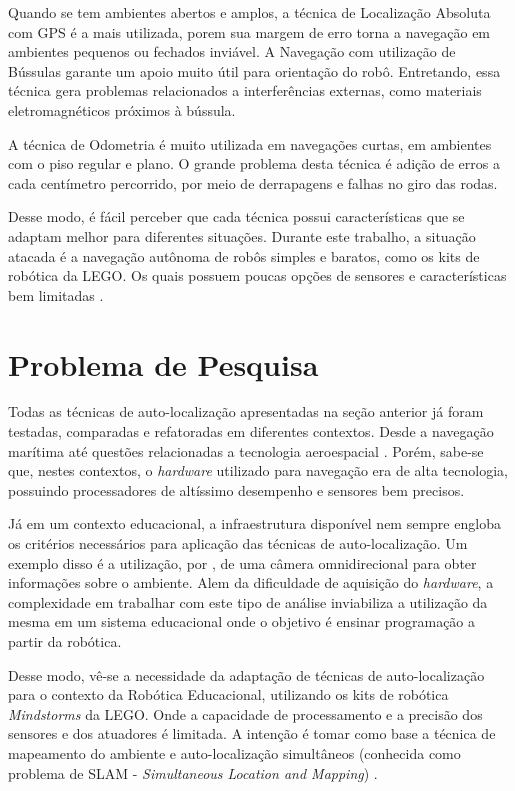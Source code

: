 	Quando se tem ambientes abertos e amplos, a técnica de Localização Absoluta com GPS é a mais utilizada, porem sua margem de erro torna a navegação em ambientes pequenos ou fechados inviável. A Navegação com utilização de Bússulas garante um apoio muito útil para orientação do robô. Entretando, essa técnica gera problemas relacionados a interferências externas, como materiais eletromagnéticos próximos à bússula.
	
	A técnica de Odometria é muito utilizada em navegações curtas, em ambientes com o piso regular e plano. O grande problema desta técnica é adição de erros a cada centímetro percorrido, por meio de derrapagens e falhas no giro das rodas. 

	Desse modo, é fácil perceber que cada técnica possui características que se adaptam melhor para diferentes situações. Durante este trabalho, a situação atacada é a navegação autônoma de robôs simples e baratos, como os kits de robótica da LEGO. Os quais possuem poucas opções de sensores e características bem limitadas \cite{drawLegoRobot}.

\section{Problema de Pesquisa}

	Todas as técnicas de auto-localização apresentadas na seção anterior já foram testadas, comparadas e refatoradas em diferentes contextos. Desde a navegação marítima até questões relacionadas a tecnologia aeroespacial \cite{localizacaoEMapeamentoPaulo}. Porém, sabe-se que, nestes contextos, o \textit{hardware} utilizado para navegação era de alta tecnologia, possuindo processadores de altíssimo desempenho e sensores bem precisos.

	Já em um contexto educacional, a infraestrutura disponível nem sempre engloba os critérios necessários para aplicação das técnicas de auto-localização. Um exemplo disso é a utilização, por \cite{localizacaoEMapeamentoPaulo}, de uma câmera omnidirecional para obter informações sobre o ambiente. Alem da dificuldade de aquisição do \textit{hardware}, a complexidade em trabalhar com este tipo de análise inviabiliza a utilização da mesma em um sistema educacional onde o objetivo é ensinar programação a partir da robótica.

	Desse modo, vê-se a necessidade da adaptação de técnicas de auto-localização para o contexto da Robótica Educacional, utilizando os kits de robótica \textit{Mindstorms} da LEGO. Onde a capacidade de processamento e a precisão dos sensores e dos atuadores é limitada. A intenção é tomar como base a técnica de mapeamento do ambiente e auto-localização simultâneos (conhecida como problema de SLAM - \textit{Simultaneous Location and Mapping}) \cite{slamProblem}.

